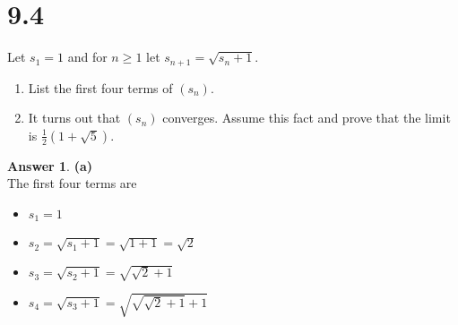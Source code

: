\documentclass[10pt,a4paper]{article}
\theoremstyle{definition}
\newtheorem*{answer*}{Answer}
\begin{document}
\section*{9.4}
Let $s_1 = 1$ and for $n\geq 1$ let $s_{n + 1} = \sqrt{s_n + 1}$.
\begin{enumerate}[label = (\alph*)]
\item List the first four terms of $(s_n)$.
\item It turns out that $(s_n)$ converges. Assume this fact and prove that the limit is $\frac{1}{2}(1 + \sqrt{5})$.
\end{enumerate}

\begin{answer*}{\textbf{(a)}}
\\The first four terms are 
\begin{itemize}
\item $s_1 = 1$
\item $s_2 = \sqrt{s_1 + 1} = \sqrt{1 + 1} = \sqrt{2}$
\item $s_3 = \sqrt{s_2 + 1} = \sqrt{\sqrt{2} + 1}$
\item $s_4 = \sqrt{s_3 + 1} = \sqrt{\sqrt{\sqrt{2} + 1} + 1}$
\end{itemize}
\end{answer*}
\end{document}
